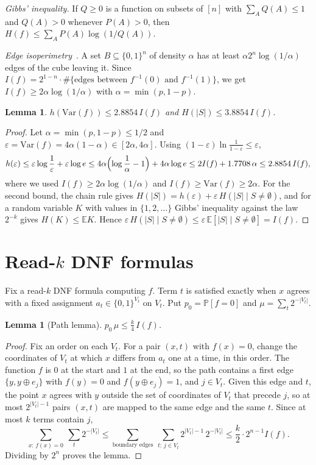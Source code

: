 \documentclass[11pt]{amsart}
\newtheorem{lemma}[theorem]{Lemma}
\theoremstyle{definition}
\theoremstyle{remark}
\newcommand{\E}{\mathbb{E}}
\renewcommand{\Pr}{\mathbb{P}}
\newcommand{\Var}{\mathrm{Var}}
\newcommand{\bits}{\{0,1\}}
\begin{document}
\emph{Gibbs' inequality.} If $Q\ge0$ is a function on subsets of $[n]$ with $\sum_AQ(A)\le1$ and $Q(A)>0$ whenever
$P(A)>0$, then $H(f)\le\sum_AP(A)\log(1/Q(A))$.

\emph{Edge isoperimetry}~\cite{Har64,Ber67,Har76}. A set $B\subseteq\bits^n$ of density $\alpha$ has at least
$\alpha 2^n\log(1/\alpha)$ edges of the cube leaving it. Since $I(f)=2^{1-n}\cdot\#\{\text{edges between }f^{-1}(0)
\text{ and }f^{-1}(1)\}$, we get $I(f)\ge2\alpha\log(1/\alpha)$ with $\alpha=\min(p,1-p)$.

\begin{lemma}\label{lem:empty}
$h(\Var(f))\le 2.8854\,I(f)$ and $H(|S|)\le3.8854\,I(f)$.
\end{lemma}

\begin{proof}
Let $\alpha=\min(p,1-p)\le1/2$ and $\varepsilon=\Var(f)=4\alpha(1-\alpha)\in[2\alpha,4\alpha]$. Using
$(1-\varepsilon)\ln\frac1{1-\varepsilon}\le\varepsilon$,
\[
h(\varepsilon)\le\varepsilon\log\frac1\varepsilon+\varepsilon\log e\le4\alpha\Bigl(\log\frac1\alpha-1\Bigr)+4\alpha\log e
\le2I(f)+1.7708\,\alpha\le2.8854\,I(f),
\]
where we used $I(f)\ge2\alpha\log(1/\alpha)$ and $I(f)\ge\Var(f)\ge2\alpha$. For the second bound, the chain rule gives
$H(|S|)=h(\varepsilon)+\varepsilon\,H(|S|\mid S\ne\emptyset)$, and for a random variable $K$ with values in
$\{1,2,\dots\}$ Gibbs' inequality against the law $2^{-k}$ gives $H(K)\le\E K$. Hence
$\varepsilon\,H(|S|\mid S\neq\emptyset)\le\varepsilon\,\E[|S|\mid S\ne\emptyset]=I(f)$.
\end{proof}

\section{Read-$k$ DNF formulas}\label{sec:readk}

Fix a read-$k$ DNF formula computing $f$. Term $t$ is satisfied exactly when $x$ agrees with a fixed assignment
$a_t\in\bits^{V_t}$ on $V_t$. Put $p_0=\Pr[f=0]$ and $\mu=\sum_t2^{-|V_t|}$.

\begin{lemma}[Path lemma]\label{lem:path}
$p_0\,\mu\le\frac k4\,I(f)$.
\end{lemma}

\begin{proof}
Fix an order on each $V_t$. For a pair $(x,t)$ with $f(x)=0$, change the coordinates of $V_t$ at which $x$ differs
from $a_t$ one at a time, in this order. The function $f$ is $0$ at the start and $1$ at the end, so the path
contains a first edge $\{y,y\oplus e_j\}$ with $f(y)=0$ and $f(y\oplus e_j)=1$, and $j\in V_t$. Given this edge
and $t$, the point $x$ agrees with $y$ outside the set of coordinates of $V_t$ that precede $j$, so at most
$2^{|V_t|-1}$ pairs $(x,t)$ are mapped to the same edge and the same $t$. Since at most $k$ terms contain $j$,
\[
\sum_{x:\,f(x)=0}\ \sum_t2^{-|V_t|}\le\sum_{\text{boundary edges}}\ \sum_{t:\,j\in V_t}2^{|V_t|-1}\,2^{-|V_t|}
\le\frac k2\cdot2^{n-1}I(f).
\]
Dividing by $2^n$ proves the lemma.
\end{proof}
\end{document}
